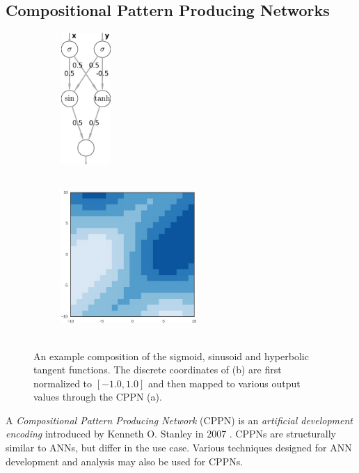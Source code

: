 \subsection{Compositional Pattern Producing Networks}
\begin{figure}
\centering
\begin{subfigure}[b]{.25\columnwidth}
\centering
\includegraphics[height=5cm, keepaspectratio]{fig/2-cppn}
\caption{~}
\end{subfigure}\hfill%
\begin{subfigure}[b]{.65\columnwidth}
\centering
\includegraphics[height=5cm, keepaspectratio]{fig/cppn_pattern}
\caption{~}
\end{subfigure}

\caption[Example CPPN]{An example composition of the sigmoid, sinusoid and hyperbolic tangent functions.
The discrete coordinates of (b) are first normalized to $[-1.0, 1.0]$ and then mapped to various output values through the CPPN (a).
}
\label{fig:cppn}
\end{figure}

A \textit{Compositional Pattern Producing Network} (CPPN) is an \textit{artificial development encoding} introduced by Kenneth O. Stanley in 2007 \cite{stanley-2007}.
CPPNs are structurally similar to ANNs, but differ in the use case.
Various techniques designed for ANN development and analysis may also be used for CPPNs.

